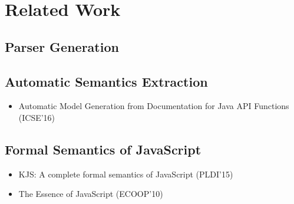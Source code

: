 \section{Related Work}

\subsection{Parser Generation}
\subsection{Automatic Semantics Extraction}
\begin{itemize}
  \item Automatic Model Generation from Documentation for Java API Functions (ICSE'16)
\end{itemize}

\subsection{Formal Semantics of JavaScript}
\begin{itemize}
  \item KJS: A complete formal semantics of JavaScript (PLDI'15)
  \item The Essence of JavaScript (ECOOP'10)
\end{itemize}

